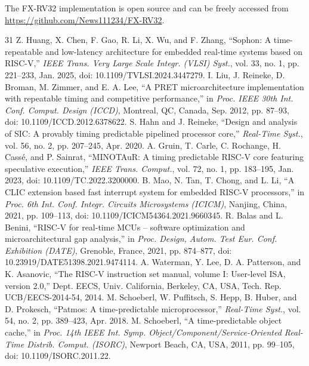 \documentclass[letterpaper,journal]{IEEEtran}
\begin{document}
\vspace{6pt}
The FX-RV32 implementation is open source and can be freely accessed from \url{https://github.com/News111234/FX-RV32}.


\begin{thebibliography}{31}
 Z. Huang, X. Chen, F. Gao, R. Li, X. Wu, and F. Zhang, ``Sophon: A time-repeatable and low-latency architecture for embedded real-time systems based on RISC-V,'' \textit{IEEE Trans. Very Large Scale Integr. (VLSI) Syst.}, vol. 33, no. 1, pp. 221--233, Jan. 2025, doi: 10.1109/TVLSI.2024.3447279.
 I. Liu, J. Reineke, D. Broman, M. Zimmer, and E. A. Lee, ``A PRET microarchitecture implementation with repeatable timing and competitive performance,'' in \textit{Proc. IEEE 30th Int. Conf. Comput. Design (ICCD)}, Montreal, QC, Canada, Sep. 2012, pp. 87--93, doi: 10.1109/ICCD.2012.6378622.
 S. Hahn and J. Reineke, ``Design and analysis of SIC: A provably timing predictable pipelined processor core,'' \textit{Real-Time Syst.}, vol. 56, no. 2, pp. 207--245, Apr. 2020.
 A. Gruin, T. Carle, C. Rochange, H. Cassé, and P. Sainrat, ``MINOTAuR: A timing predictable RISC-V core featuring speculative execution,'' \textit{IEEE Trans. Comput.}, vol. 72, no. 1, pp. 183--195, Jan. 2023, doi: 10.1109/TC.2022.3200000.
 B. Mao, N. Tan, T. Chong, and L. Li, ``A CLIC extension based fast interrupt system for embedded RISC-V processors,'' in \textit{Proc. 6th Int. Conf. Integr. Circuits Microsystems (ICICM)}, Nanjing, China, 2021, pp. 109--113, doi: 10.1109/ICICM54364.2021.9660345.
 R. Balas and L. Benini, ``RISC-V for real-time MCUs -- software optimization and microarchitectural gap analysis,'' in \textit{Proc. Design, Autom. Test Eur. Conf. Exhibition (DATE)}, Grenoble, France, 2021, pp. 874--877, doi: 10.23919/DATE51398.2021.9474114.
 A. Waterman, Y. Lee, D. A. Patterson, and K. Asanovic, ``The RISC-V instruction set manual, volume I: User-level ISA, version 2.0,'' Dept. EECS, Univ. California, Berkeley, CA, USA, Tech. Rep. UCB/EECS-2014-54, 2014.
 M. Schoeberl, W. Puffitsch, S. Hepp, B. Huber, and D. Prokesch, ``Patmos: A time-predictable microprocessor,'' \textit{Real-Time Syst.}, vol. 54, no. 2, pp. 389--423, Apr. 2018.
 M. Schoeberl, ``A time-predictable object cache,'' in \textit{Proc. 14th IEEE Int. Symp. Object/Component/Service-Oriented Real-Time Distrib. Comput. (ISORC)}, Newport Beach, CA, USA, 2011, pp. 99--105, doi: 10.1109/ISORC.2011.22.

\end{thebibliography}
\end{document}

